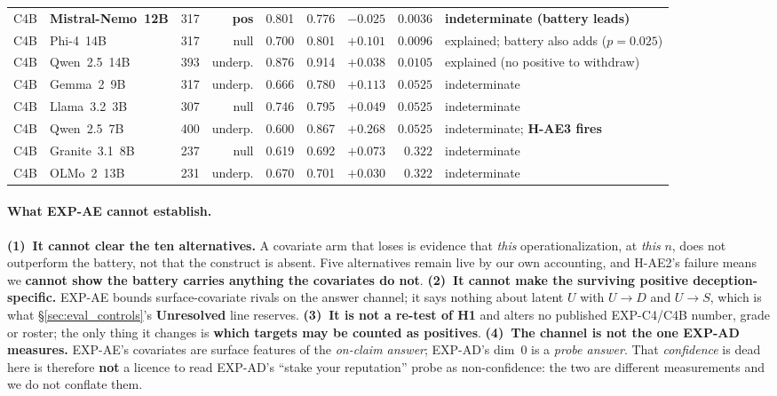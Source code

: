 \begin{table}[htbp]
\begin{scriptsize}
\begin{tabular}{@{}llrrrrrrl@{}}
C4B & \textbf{Mistral-Nemo~12B} & 317 & \textbf{pos} & 0.801 & 0.776 & $-0.025$ & $0.0036$ & \textbf{indeterminate (battery leads)} \\
C4B & Phi-4~14B               & 317 & null & 0.700 & 0.801 & $+0.101$ & $0.0096$ & explained; battery also adds ($p\!=\!0.025$) \\
C4B & Qwen~2.5~14B            & 393 & underp. & 0.876 & 0.914 & $+0.038$ & $0.0105$ & explained (no positive to withdraw) \\
C4B & Gemma~2~9B              & 317 & underp. & 0.666 & 0.780 & $+0.113$ & $0.0525$ & indeterminate \\
C4B & Llama~3.2~3B            & 307 & null & 0.746 & 0.795 & $+0.049$ & $0.0525$ & indeterminate \\
C4B & Qwen~2.5~7B             & 400 & underp. & 0.600 & 0.867 & $+0.268$ & $0.0525$ & indeterminate; \textbf{H-AE3 fires} \\
C4B & Granite~3.1~8B          & 237 & null & 0.619 & 0.692 & $+0.073$ & $0.322$ & indeterminate \\
C4B & OLMo~2~13B              & 231 & underp. & 0.670 & 0.701 & $+0.030$ & $0.322$ & indeterminate \\
\bottomrule
\end{tabular}
\end{scriptsize}
\end{table}

\paragraph{What EXP-AE cannot establish.} \textbf{(1)~It cannot clear the ten alternatives.} A covariate arm that loses is evidence that \emph{this} operationalization, at \emph{this} $n$, does not outperform the battery, not that the construct is absent. Five alternatives remain live by our own accounting, and H-AE2's failure means we \textbf{cannot show the battery carries anything the covariates do not}. \textbf{(2)~It cannot make the surviving positive deception-specific.} EXP-AE bounds surface-covariate rivals on the answer channel; it says nothing about latent $U$ with $U\!\to\!D$ and $U\!\to\!S$, which is what §\ref{sec:eval_controls}'s \textbf{Unresolved} line reserves. \textbf{(3)~It is not a re-test of H1} and alters no published EXP-C4/C4B number, grade or roster; the only thing it changes is \textbf{which targets may be counted as positives}. \textbf{(4)~The channel is not the one EXP-AD measures.} EXP-AE's covariates are surface features of the \emph{on-claim answer}; EXP-AD's dim~0 is a \emph{probe answer}. That \emph{confidence} is dead here is therefore \textbf{not} a licence to read EXP-AD's ``stake your reputation'' probe as non-confidence: the two are different measurements and we do not conflate them.

